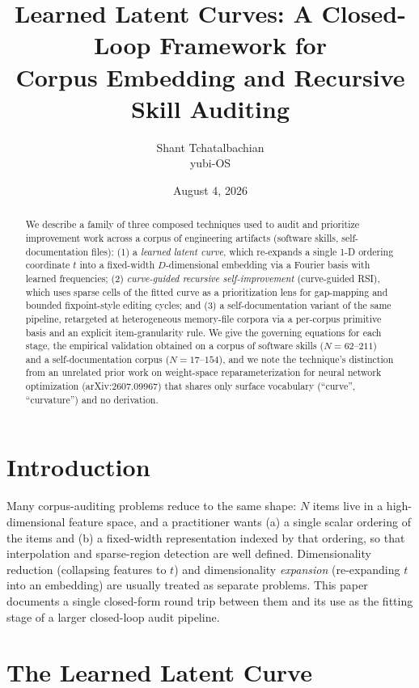\documentclass[11pt]{article}
\title{Learned Latent Curves: A Closed-Loop Framework for\\ Corpus Embedding and Recursive Skill Auditing}
\author{Shant Tchatalbachian \\ \small yubi-OS}
\date{August 4, 2026}
\begin{document}
\maketitle

\begin{abstract}
We describe a family of three composed techniques used to audit and prioritize
improvement work across a corpus of engineering artifacts (software skills,
self-documentation files): (1) a \emph{learned latent curve}, which re-expands
a single 1-D ordering coordinate $t$ into a fixed-width $D$-dimensional
embedding via a Fourier basis with learned frequencies; (2) \emph{curve-guided
recursive self-improvement} (curve-guided RSI), which uses sparse cells of the
fitted curve as a prioritization lens for gap-mapping and bounded
fixpoint-style editing cycles; and (3) a self-documentation variant of the
same pipeline, retargeted at heterogeneous memory-file corpora via a
per-corpus primitive basis and an explicit item-granularity rule. We give the
governing equations for each stage, the empirical validation obtained on a
corpus of software skills ($N=62$–$211$) and a self-documentation corpus
($N=17$–$154$), and we note the technique's distinction from an unrelated
prior work on weight-space reparameterization for neural network optimization
(arXiv:2607.09967) that shares only surface vocabulary (``curve'',
``curvature'') and no derivation.
\end{abstract}

\section{Introduction}

Many corpus-auditing problems reduce to the same shape: $N$ items live in a
high-dimensional feature space, and a practitioner wants (a) a single scalar
ordering of the items and (b) a fixed-width representation indexed by that
ordering, so that interpolation and sparse-region detection are well defined.
Dimensionality reduction (collapsing features to $t$) and dimensionality
\emph{expansion} (re-expanding $t$ into an embedding) are usually treated as
separate problems. This paper documents a single closed-form round trip
between them and its use as the fitting stage of a larger closed-loop audit
pipeline.

\section{The Learned Latent Curve}
\label{sec:curve}
\end{document}

